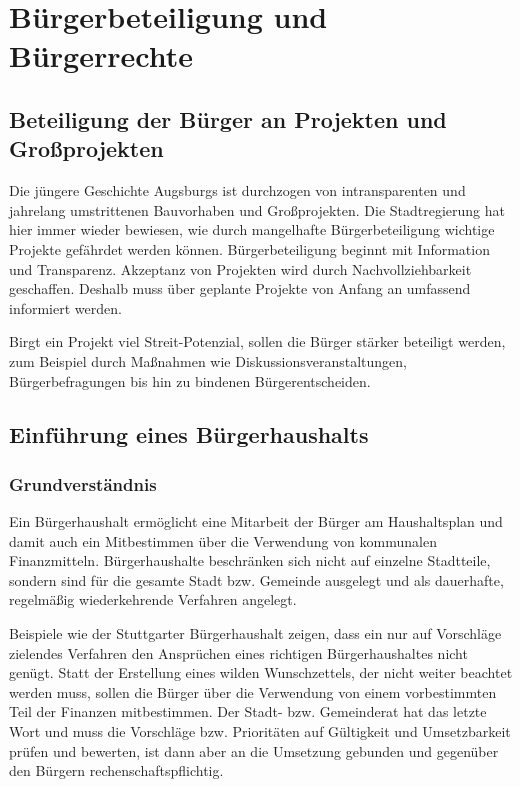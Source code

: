 \chapter{Bürgerbeteiligung und Bürgerrechte}
  
  \section{Beteiligung der Bürger an Projekten und Großprojekten}
  
  Die jüngere Geschichte Augsburgs ist durchzogen von intransparenten und 
  jahrelang umstrittenen Bauvorhaben und Großprojekten. Die Stadtregierung hat 
  hier immer wieder bewiesen, wie durch mangelhafte Bürgerbeteiligung wichtige 
  Projekte gefährdet werden können. Bürgerbeteiligung beginnt mit Information 
  und Transparenz. Akzeptanz von Projekten wird durch Nachvollziehbarkeit 
  geschaffen. Deshalb muss über geplante Projekte von Anfang an umfassend 
  informiert werden.
  
  Birgt ein Projekt viel Streit-Potenzial, sollen die Bürger stärker beteiligt 
  werden, zum Beispiel durch Maßnahmen wie Diskussionsveranstaltungen, 
  Bürgerbefragungen bis hin zu bindenen Bürgerentscheiden.
  
  \section{Einführung eines Bürgerhaushalts}
  
  \subsection{Grundverständnis}
  
  Ein Bürgerhaushalt ermöglicht eine Mitarbeit der Bürger am Haushaltsplan und 
  damit auch ein Mitbestimmen über die Verwendung von kommunalen 
  Finanzmitteln. Bürgerhaushalte beschränken sich nicht auf einzelne 
  Stadtteile, sondern sind für die gesamte Stadt bzw. Gemeinde ausgelegt und 
  als dauerhafte, regelmäßig wiederkehrende Verfahren angelegt.
  
  Beispiele wie der Stuttgarter Bürgerhaushalt zeigen, dass ein nur auf 
  Vorschläge zielendes Verfahren den Ansprüchen eines richtigen 
  Bürgerhaushaltes nicht genügt. Statt der Erstellung eines wilden 
  Wunschzettels, der nicht weiter beachtet werden muss, sollen die Bürger über 
  die Verwendung von einem vorbestimmten Teil der Finanzen mitbestimmen. Der 
  Stadt- bzw. Gemeinderat hat das letzte Wort und muss die Vorschläge bzw. 
  Prioritäten auf Gültigkeit und Umsetzbarkeit prüfen und bewerten, ist dann 
  aber an die Umsetzung gebunden und gegenüber den Bürgern 
  rechenschaftspflichtig.
  
